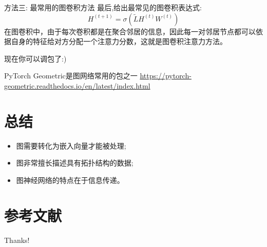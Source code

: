 \documentclass{beamer}
\begin{document}
\begin{frame}{方法三: 最常用的图卷积方法}
    最后,给出最常见的图卷积表达式:
    $$H^{(t+1)} = \sigma(\tilde{L}H^{(t)}W^{(t)})$$
    在图卷积中，由于每次卷积都是在聚合邻居的信息，因此每一对邻居节点都可以依据自身的特征给对方分配一个注意力分数，这就是图卷积注意力方法。
    \newline

    现在你可以调包了:)
    \newline

    PyTorch Geometric是图网络常用的包之一
    \url{https://pytorch-geometric.readthedocs.io/en/latest/index.html}
\end{frame}

\section{总结}

\begin{frame}
    \begin{itemize}
        \item 图需要转化为嵌入向量才能被处理;
        \item 图非常擅长描述具有拓扑结构的数据;
        \item 图神经网络的特点在于信息传递。
    \end{itemize}
\end{frame}

\section{参考文献}

\begin{frame} %
    
    
\end{frame}

\begin{frame}
    \begin{center}
        {\Huge\calligra Thanks!}
    \end{center}
\end{frame}
\end{document}
